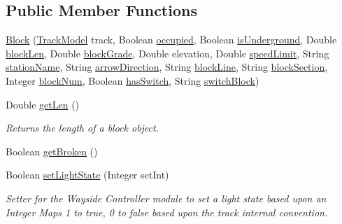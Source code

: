\subsection*{Public Member Functions}
\begin{DoxyCompactItemize}
\item 
\hyperlink{classTrackModel_1_1Block_a016adcf378ac0c1738bd95a4db52f913}{Block} (\hyperlink{classTrackModel_1_1TrackModel}{Track\+Model} track, Boolean \hyperlink{classTrackModel_1_1Block_a000b5a3720b78b92062bbd2a9c560f6a}{occupied}, Boolean \hyperlink{classTrackModel_1_1Block_a3cb044acc87b68c2f7e482c2cdfdeab2}{is\+Underground}, Double \hyperlink{classTrackModel_1_1Block_a2272dc912ea46c59930f09258668a833}{block\+Len}, Double \hyperlink{classTrackModel_1_1Block_a445ba69829a748448595df9e048cc2ab}{block\+Grade}, Double elevation, Double \hyperlink{classTrackModel_1_1Block_a62ab3ddedf85055005dfdd4402716e65}{speed\+Limit}, String \hyperlink{classTrackModel_1_1Block_a178efb49178fd7418c6391ea3e35f106}{station\+Name}, String \hyperlink{classTrackModel_1_1Block_ad5c1ad3ac7452483c42dec413dbb63ab}{arrow\+Direction}, String \hyperlink{classTrackModel_1_1Block_a04e22a2597bed95ae3ed8f723b63de94}{block\+Line}, String \hyperlink{classTrackModel_1_1Block_a2adc620752945c54ae212bc4b6043975}{block\+Section}, Integer \hyperlink{classTrackModel_1_1Block_a429f329eb3c1e2ff40389df240f02b00}{block\+Num}, Boolean \hyperlink{classTrackModel_1_1Block_a1970e1588e5e0645096dc13094b640ff}{has\+Switch}, String \hyperlink{classTrackModel_1_1Block_a04565d6aa499ef51700e9e69d290e7e0}{switch\+Block})
\item 
Double \hyperlink{classTrackModel_1_1Block_af62e4fd52ba4f65098dd76ef8382fdde}{get\+Len} ()
\begin{DoxyCompactList}\small\item\em Returns the length of a block object. \end{DoxyCompactList}\item 
Boolean \hyperlink{classTrackModel_1_1Block_aa1ac9505793be31e681ef21dba05b85a}{get\+Broken} ()
\item 
Boolean \hyperlink{classTrackModel_1_1Block_ade3dc0b39ce6d111e7491443b052051e}{set\+Light\+State} (Integer set\+Int)
\begin{DoxyCompactList}\small\item\em Setter for the Wayside Controller module to set a light state based upon an Integer Maps 1 to true, 0 to false based upon the track internal convention. \end{DoxyCompactList}\item 

\end{DoxyCompactItemize}
